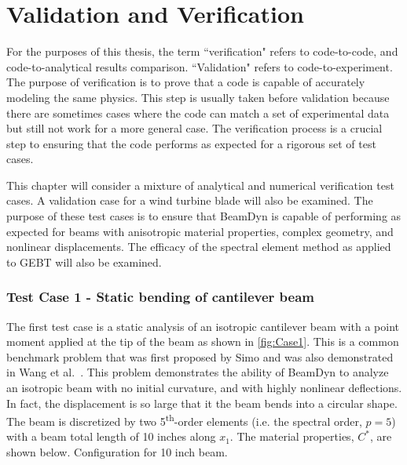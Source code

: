 \documentclass[letterpaper,12pt]{article}
\begin{document}
\chapter{Validation and Verification}
For the purposes of this thesis, the term ``verification" refers to code-to-code, and code-to-analytical results comparison. ``Validation" refers to code-to-experiment. The purpose of verification is to prove that a code is capable of accurately modeling the same physics. This step is usually taken before validation because there are sometimes cases where the code can match a set of experimental data but still not work for a more general case. The verification process is a crucial step to ensuring that the code performs as expected for a rigorous set of test cases. 

This chapter will consider a mixture of analytical and numerical verification test cases. A validation case for a wind turbine blade will also be examined. The purpose of these test cases is to ensure that BeamDyn is capable of performing as expected for beams with anisotropic material properties, complex geometry, and nonlinear displacements. The efficacy of the spectral element method as applied to GEBT will also be examined.

\subsection{Test Case 1 - Static bending of cantilever beam}
The first test case is a static analysis of an isotropic cantilever beam with a point moment applied at the tip of the beam as shown in \ref{fig:Case1}. This is a common benchmark problem that was first proposed by Simo \cite{Simo1985} and was also demonstrated in Wang et al.\ \cite{Wang:GEBT2014}. This problem demonstrates the ability of BeamDyn to analyze an isotropic beam with no initial curvature, and with highly nonlinear deflections. In fact, the displacement is so large that it the beam bends into a circular shape. The beam is discretized by two 5\textsuperscript{th}-order elements (i.e. the spectral order, $p=5$) with a beam total length of 10 inches along $x_1$. The material properties, $C^*$, are shown below. 
  {Configuration for 10 inch beam.}
 
\end{document}
